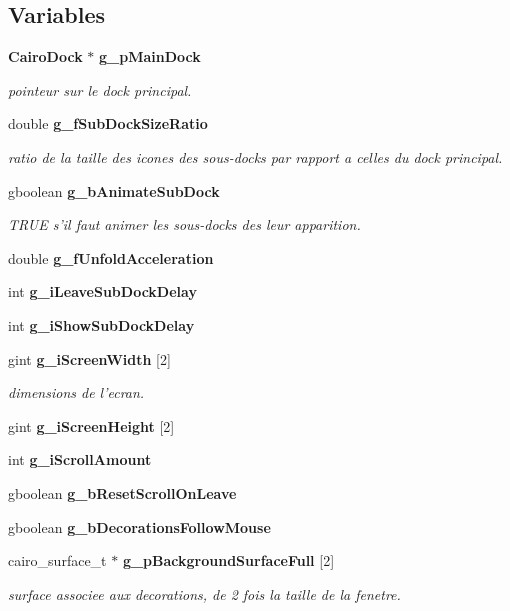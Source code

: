 \subsection*{Variables}
\begin{CompactItemize}
\item 
{\bf Cairo\-Dock} $\ast$ {\bf g\_\-p\-Main\-Dock}
\begin{CompactList}\small\item\em pointeur sur le dock principal. \item\end{CompactList}\item 
double {\bf g\_\-f\-Sub\-Dock\-Size\-Ratio}
\begin{CompactList}\small\item\em ratio de la taille des icones des sous-docks par rapport a celles du dock principal. \item\end{CompactList}\item 
gboolean {\bf g\_\-b\-Animate\-Sub\-Dock}
\begin{CompactList}\small\item\em TRUE s'il faut animer les sous-docks des leur apparition. \item\end{CompactList}\item 
double {\bf g\_\-f\-Unfold\-Acceleration}
\item 
int {\bf g\_\-i\-Leave\-Sub\-Dock\-Delay}
\item 
int {\bf g\_\-i\-Show\-Sub\-Dock\-Delay}
\item 
gint {\bf g\_\-i\-Screen\-Width} [2]
\begin{CompactList}\small\item\em dimensions de l'ecran. \item\end{CompactList}\item 
gint {\bf g\_\-i\-Screen\-Height} [2]
\item 
int {\bf g\_\-i\-Scroll\-Amount}
\item 
gboolean {\bf g\_\-b\-Reset\-Scroll\-On\-Leave}
\item 
gboolean {\bf g\_\-b\-Decorations\-Follow\-Mouse}
\item 
cairo\_\-surface\_\-t $\ast$ {\bf g\_\-p\-Background\-Surface\-Full} [2]
\begin{CompactList}\small\item\em surface associee aux decorations, de 2 fois la taille de la fenetre. \item\end{CompactList}\item 

\end{CompactItemize}
